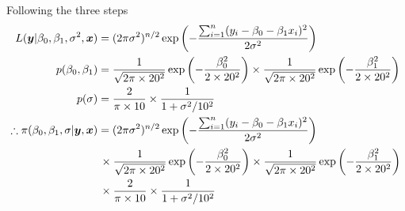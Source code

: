 \documentclass{article}
\begin{document}
Following the three steps
\[
\begin{split}
L(\boldsymbol{y}|\beta_0,\beta_1,\sigma^2,\boldsymbol{x})&=(2\pi\sigma^2)^{n/2}\exp\left(-\frac{\sum_{i=1}^n(y_i-\beta_0-\beta_1x_i)^2}{2\sigma^2}\right)\\
p(\beta_0,\beta_1)&=\frac{1}{\sqrt{2\pi \times 20^2}}\exp\left(-\frac{\beta_0^2}{2\times 20^2}\right)\times \frac{1}{\sqrt{2\pi \times 20^2}}\exp\left(-\frac{\beta_1^2}{2\times 20^2}\right)\\
p(\sigma)&=\frac{2}{\pi\times 10}\times\frac{1}{1+\sigma^2/10^2}\\
\therefore\pi(\beta_0,\beta_1,\sigma|\boldsymbol{y},\boldsymbol{x})&=(2\pi\sigma^2)^{n/2}\exp\left(-\frac{\sum_{i=1}^n(y_i-\beta_0-\beta_1x_i)^2}{2\sigma^2}\right)\\
&\,\times\frac{1}{\sqrt{2\pi \times 20^2}}\exp\left(-\frac{\beta_0^2}{2\times 20^2}\right)\times \frac{1}{\sqrt{2\pi \times 20^2}}\exp\left(-\frac{\beta_1^2}{2\times 20^2}\right)\\
&\,\times\frac{2}{\pi\times 10}\times\frac{1}{1+\sigma^2/10^2}
\end{split}
\]
\end{document}
